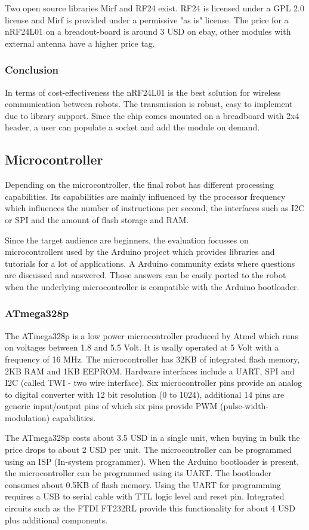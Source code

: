\documentclass[11pt,a4paper]{article}
\begin{document}
Two open source libraries Mirf and RF24 exist. RF24 is licensed under a GPL 2.0 license and Mirf is provided under a permissive "as is" license. The price for a nRF24L01 on a breadout-board is around 3 USD on ebay, other modules with external antenna have a higher price tag.
\subsubsection{Conclusion}
In terms of cost-effectiveness the nRF24L01 is the best solution for wireless communication between robots. The transmission is robust, easy to implement due to library support. Since the chip comes mounted on a breadboard with 2x4 header, a user can populate a socket and add the module on demand.
\subsection{Microcontroller}
Depending on the microcontroller, the final robot has different processing capabilities. Its capabilities are mainly influenced by the processor frequency which influences the number of instructions per second, the interfaces such as I2C or SPI and the amount of flash storage and RAM.

Since the target audience are beginners, the evaluation focusses on microcontrollers used by the Arduino project which provides libraries and tutorials for a lot of applications. A Arduino community exists where questions are discussed and answered. Those answers can be easily ported to the robot when the underlying microcontroller is compatible with the Arduino bootloader.
\subsubsection{ATmega328p}
The ATmega328p is a low power microcontroller produced by Atmel which runs on voltages between 1.8 and 5.5 Volt. It is usally operated at 5 Volt with a frequency of 16 MHz. The microcontroller has 32KB of integrated flash memory, 2KB RAM and 1KB EEPROM. Hardware interfaces include a UART, SPI and I2C (called TWI - two wire interface). Six microcontroller pins provide an analog to digital converter with 12 bit resolution (0 to 1024), additional 14 pins are generic input/output pins of which six pins provide PWM (pulse-width-modulation) capabilities.

The ATmega328p costs about 3.5 USD in a single unit, when buying in bulk the price drops to about 2 USD per unit. The microcontroller can be programmed using an ISP (In-system programmer). When the Arduino bootloader is present, the microcontroller can be programmed using its UART. The bootloader consumes about 0.5KB of flash memory. Using the UART for programming requires a USB to serial cable with TTL logic level and reset pin. Integrated circuits such as the FTDI  FT232RL provide this functionality for about 4 USD plus additional components.
\end{document}
